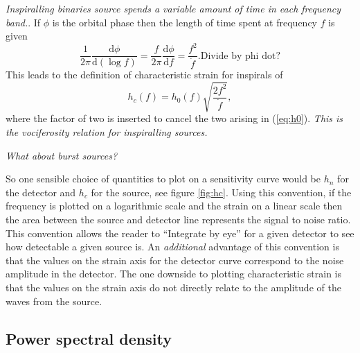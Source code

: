 \emph{Inspiralling binaries source spends a variable amount of time in each frequency band.}. If $\phi$ is the orbital phase then the length of time spent at frequency $f$ is given
\begin{equation}\label{eq:inspiral}
 \frac{1}{2\pi}\frac{\textrm{d}\phi}{\textrm{d}\left(\log f\right)} = \frac{f}{2\pi}\frac{\textrm{d}\phi}{\textrm{d}f}=\frac{f^{2}}{\dot{f}}. \textrm{Divide by phi dot?}
\end{equation}
This leads to the definition of characteristic strain for inspirals of \citep{FinnThorne}
\begin{equation}\label{eq:hc1}
 h_{c}(f)=h_{0}(f)\sqrt{\frac{2f^{2}}{\dot{f}}},
\end{equation}
where the factor of two is inserted to cancel the two arising in (\ref{eq:h0}). \emph{This is the vociferosity relation for inspiralling sources.}

\emph{What about burst sources?}

So one sensible choice of quantities to plot on a sensitivity curve would be $h_{n}$ for the detector and $h_{c}$ for the source, see figure \ref{fig:hc}. Using this convention, if the frequency is plotted on a logarithmic scale and the strain on a linear scale then the area between the source and detector line represents the signal to noise ratio. This convention allows the reader to ``Integrate by eye'' for a given detector to see how detectable a given source is. An \emph{additional} advantage of this convention is that the values on the strain axis for the detector curve correspond to the noise amplitude in the detector. The one downside to plotting characteristic strain is that the values on the strain axis do not directly relate to the amplitude of the waves from the source.

\subsection{Power spectral density}

